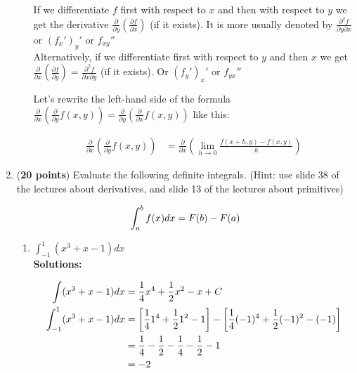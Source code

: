 \documentclass[a4paper]{article}
\begin{document}
\begin{enumerate}
\begin{enumerate}
	
		
If we differentiate $f$ first with respect to $x$ and then with respect to $y$ we get the derivative $\frac{\partial}{\partial y} (\frac{\partial f}{\partial x})$ (if it exists). It is more usually denoted by $\frac{\partial^2 f}{\partial y \partial x}$ or $(f_x')_y'$ or $f_{xy}''$\\

Alternatively, if we differentiate first with respect to $y$ and then $x$ we get $\frac{\partial}{\partial x} (\frac{\partial f}{\partial y}) = \frac{\partial^2 f}{\partial x \partial y}$ (if it exists). Or $(f_y')_x'$ or $f_{yx}''$
		
Let's rewrite the left-hand side of the formula	$\frac{\partial}{\partial x}(\frac{\partial}{\partial y}f(x,y)) = \frac{\partial}{\partial y}(\frac{\partial}{\partial x}f(x,y))$ like this:

\begin{align*}
	\frac{\partial}{\partial x}(\frac{\partial}{\partial y}f(x,y)) &= \frac{\partial}{\partial x}(\lim_{h \to 0} \frac{f(x + h,y) - f(x,y)}{h})%
\end{align*}
		
		
		
\end{enumerate}




\item (\textbf{20 points}) Evaluate the following definite integrals. (Hint: use slide 38 of the lectures about derivatives, and slide 13 of the lectures about primitives)

\begin{align}
	\int_{a}^b f(x) dx = F(b) - F(a)\notag
\end{align}



\begin{enumerate}
	\item $\int_{-1}^1(x^3 + x - 1)dx$\\
	
	\textbf{Solutions:}
	
\begin{align}
	\int (x^3 + x - 1)dx &= \frac{1}{4}x^4 + \frac{1}{2}x^2 - x + C \notag\\
	\int_{-1}^1(x^3 + x - 1)dx &= \left[ \frac{1}{4}1^4 + \frac{1}{2}1^2 - 1  \right] - \left[ \frac{1}{4}(-1)^4 + \frac{1}{2}(-1)^2 - (-1)\right]\notag\\
	&= \frac{1}{4} - \frac{1}{2} - \frac{1}{4} - \frac{1}{2} - 1\notag\\
	&= -2\notag
\end{align}	
	

\end{enumerate}
\end{enumerate}
\end{document}
